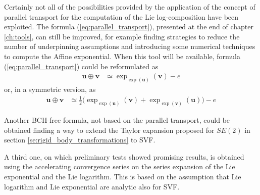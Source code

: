 Certainly not all of the possibilities provided by the application of the concept of parallel transport for the computation of the Lie log-composition have been exploited. The formula (\ref{eq:parallel_transport}), presented at the end of chapter \ref{ch:tools}, can still be improved, for example finding strategies to reduce the number of underpinning assumptions and introducing some numerical techniques to compute the Affine exponential. When this tool will be available, formula (\ref{eq:parallel_transport}) could be reformulated as
\begin{align*}
\mathbf{u}\oplus \mathbf{v}
&\simeq
\exp_{\exp(\mathbf{u} )}(\mathbf{v} ) - e
\end{align*} 
or, in a symmetric version,  as
\begin{align*}
\mathbf{u}\oplus \mathbf{v}
&\simeq
\frac{1}{2}
\big(
\exp_{\exp(\mathbf{u} )}(\mathbf{v} ) 
+
\exp_{\exp(\mathbf{v} )}(\mathbf{u} )
\big)
-  e
\end{align*} 

Another BCH-free formula, not based on the parallel transport, could be obtained finding a way to extend the Taylor expansion proposed for $SE(2)$ in section \ref{se:rigid_body_transformations} to SVF.

A third one, on which  preliminary tests showed promising results, is obtained using the accelerating convergence series \cite{cohen2000convergence} on the series expansion of the Lie exponential and the Lie logarithm. This is based on the assumption that Lie logarithm and Lie exponential are analytic also for SVF.

